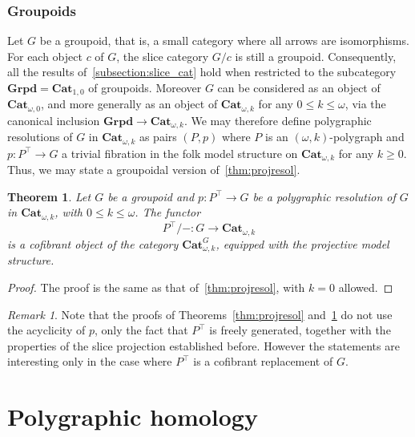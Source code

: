 \documentclass[reqno]{amsart}
\theoremstyle{plain}
\newtheorem{theorem}[subsubsection]{Theorem}
\theoremstyle{definition}
\theoremstyle{remark}
\newtheorem{remark}[subsubsection]{Remark}
\newcommand{\pair}[2]{(#1,#2)}       %
\newcommand{\tr}[2]{#1/#2} %
\newcommand{\ctg}[1]{\mathbf{#1}}  %
\newcommand{\Cat}{\ctg{Cat}}   %
\newcommand{\npCat}[2]{\Cat_{#1,#2}}  %
\newcommand{\opCat}[1]{\Cat_{\omega,#1}} %
\newcommand{\funopCat}[2]{\Cat_{\omega,#1}^{#2}} %
\newcommand{\Grpd}{\ctg{Grpd}}
\newcommand{\frgp}[1]{#1^\top} %
\newcommand{\oo}{\ensuremath{\omega}}
\newcommand{\ook}[1]{\ensuremath{\pair{\omega}{#1}}}
\begin{document}
\subsubsection{Groupoids}\label{ssubsec:resol_grp}
Let $G$ be a groupoid, that is, a small category where all arrows are
isomorphisms. For each
object $c$ of $G$, the slice category $\tr Gc$ is still a groupoid. Consequently,
all the results of~\cref{subsection:slice_cat} hold when restricted to the
subcategory $\Grpd=\npCat 10$ of groupoids. Moreover $G$ can be
considered as an object of $\opCat 0$, and more generally as an object of $\opCat k$ for any $0\leq k \leq \oo$, via the canonical inclusion $\Grpd \to \opCat k$. We may therefore
define polygraphic resolutions of $G$ in $\opCat k$ as pairs $\pair
Pp$ where $P$ is an $\ook
k$-polygraph and  $p:\frgp P\to G$ a trivial fibration
in the folk model structure on $\opCat k$ for any $k\geq 0$.  Thus, we may state a
groupoidal version of~\cref{thm:projresol}.
\begin{theorem}\label{thm:projresol_grp} Let $G$ be a groupoid and
$p:\frgp P\to G$ be a polygraphic resolution of $G$ in $\opCat k$, with
$0\leq k\leq \oo$. The functor
    \[\tr{\frgp P\!}{-}:G\to \opCat k\] is a cofibrant object of the
category $\funopCat{k}{G}$, equipped with the projective model
structure.
\end{theorem}
\begin{proof} The proof is the same as that of~\cref{thm:projresol},
  with $k=0$ allowed.
\end{proof}
\begin{remark} Note that the proofs of Theorems~\ref{thm:projresol}
  and~\ref{thm:projresol_grp} do not use the acyclicity of $p$, only the
  fact that $\frgp P$ is freely generated, together with the properties
  of the slice projection established before. However the statements are
  interesting only in the case where $\frgp P$ is a cofibrant
  replacement of $G$.
\end{remark}
\section{Polygraphic homology}\label{sec:polhom}
\end{document}
